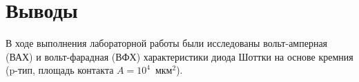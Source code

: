 \documentclass[a4paper,12pt]{article}
\begin{document}

\section*{Выводы}

В ходе выполнения лабораторной работы были исследованы вольт-амперная (ВАХ) и вольт-фарадная (ВФХ) характеристики диода Шоттки на основе кремния (p-тип, площадь контакта $A = 10^4$~мкм$^2$).
\end{document}
